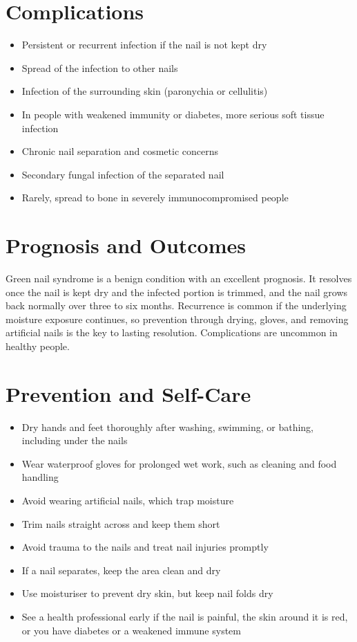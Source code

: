 \section*{Complications}
\begin{itemize}
    \item Persistent or recurrent infection if the nail is not kept dry
    \item Spread of the infection to other nails
    \item Infection of the surrounding skin (paronychia or cellulitis)
    \item In people with weakened immunity or diabetes, more serious soft tissue infection
    \item Chronic nail separation and cosmetic concerns
    \item Secondary fungal infection of the separated nail
    \item Rarely, spread to bone in severely immunocompromised people
\end{itemize}

\section*{Prognosis and Outcomes}
Green nail syndrome is a benign condition with an excellent prognosis. It resolves once the nail is kept dry and the infected portion is trimmed, and the nail grows back normally over three to six months. Recurrence is common if the underlying moisture exposure continues, so prevention through drying, gloves, and removing artificial nails is the key to lasting resolution. Complications are uncommon in healthy people.

\section*{Prevention and Self-Care}
\begin{itemize}
    \item Dry hands and feet thoroughly after washing, swimming, or bathing, including under the nails
    \item Wear waterproof gloves for prolonged wet work, such as cleaning and food handling
    \item Avoid wearing artificial nails, which trap moisture
    \item Trim nails straight across and keep them short
    \item Avoid trauma to the nails and treat nail injuries promptly
    \item If a nail separates, keep the area clean and dry
    \item Use moisturiser to prevent dry skin, but keep nail folds dry
    \item See a health professional early if the nail is painful, the skin around it is red, or you have diabetes or a weakened immune system
\end{itemize}


